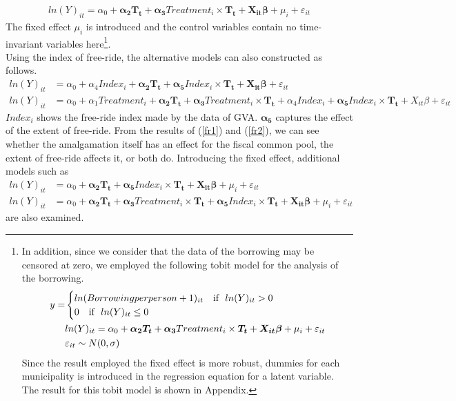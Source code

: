 \documentclass[dvipdfmx]{jsarticle}
\begin{document}
\begin{align}
ln(Y)_{it}=\alpha_0+\bm{\alpha_2T_t}+\bm{\alpha_3}Treatment_i\times \bm{T_t}+\bm{X_{it}\beta}+\mu_i+\varepsilon_{it}
\end{align}
The fixed effect $\mu_i$ is introduced and the control variables contain no time-invariant variables here\footnote{In addition, since we consider that the data of the borrowing may be censored at zero, we employed the following tobit model for the analysis of the borrowing.
\begin{align}
y=&\begin{cases}
ln(Borrowing per person+1)_{it}\text{ \ \ if \ }ln(Y)_{it}>0\\
0\text{ \ \ if \ }ln(Y)_{it}\le0
\end{cases}\notag\\
&ln(Y)_{it}=\alpha_0+\bm{\alpha_2T_t}+\bm{\alpha_3}Treatment_i\times \bm{T_t}+\bm{X_{it}\beta}+\mu_i+\varepsilon_{it}\notag\\
&\varepsilon_{it}\sim N(0,\sigma)\notag
\end{align}
Since the result employed the fixed effect is more robust, dummies for each municipality is introduced in the regression equation for a latent variable. The result for this tobit model is shown in Appendix.}.\\
\quad Using the index of free-ride, the alternative models can also constructed as follows.
\begin{align}
ln(Y)_{it}&=\alpha_0+\alpha_4Index_i+\bm{\alpha_2T_t}+\bm{\alpha_5}Index_i\times \bm{T_t}+\bm{X_{it}\beta}+\varepsilon_{it}\label{fr1}\\
ln(Y)_{it}&=\alpha_0+\alpha_1Treatment_i+\bm{\alpha_2T_t}+\bm{\alpha_3}Treatment_i\times \bm{T_t}+\alpha_4Index_i+\bm{\alpha_5}Index_i\times \bm{T_t}+X_{it}\beta+\varepsilon_{it}\label{fr2}
\end{align}
$Index_i$ shows the free-ride index made by the data of GVA. $\bm{\alpha_5}$ captures the effect of the extent of free-ride. From the results of (\ref{fr1}) and (\ref{fr2}), we can see whether the amalgamation itself has an effect for the fiscal common pool, the extent of free-ride affects it, or both do. Introducing the fixed effect, additional models such as
\begin{align}
ln(Y)_{it}&=\alpha_0+\bm{\alpha_2T_t}+\bm{\alpha_5}Index_i\times \bm{T_t}+\bm{X_{it}\beta}+\mu_i+\varepsilon_{it}\\
ln(Y)_{it}&=\alpha_0+\bm{\alpha_2T_t}+\bm{\alpha_3}Treatment_i\times \bm{T_t}+\bm{\alpha_5}Index_i\times \bm{T_t}+\bm{X_{it}\beta}+\mu_i+\varepsilon_{it}
\end{align}
are also examined.
\end{document}
